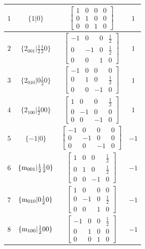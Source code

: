 \documentclass[fleqn,8pt]{jsarticle}
\begin{document}
\begin{longtable}{cccc}
$ 1 $ & $ \{1|0\} $ & $ \begin{bmatrix} 1 & 0 & 0 & 0 \\ 0 & 1 & 0 & 0 \\ 0 & 0 & 1 & 0 \end{bmatrix} $ & $ 1 $ \\ \hline
$ 2 $ & $ \{2{}_{001}|\frac{1}{2} \frac{1}{2} 0\} $ & $ \begin{bmatrix} -1 & 0 & 0 & \frac{1}{2} \\ 0 & -1 & 0 & \frac{1}{2} \\ 0 & 0 & 1 & 0 \end{bmatrix} $ & $ 1 $ \\ \hline
$ 3 $ & $ \{2{}_{010}|0 \frac{1}{2} 0\} $ & $ \begin{bmatrix} -1 & 0 & 0 & 0 \\ 0 & 1 & 0 & \frac{1}{2} \\ 0 & 0 & -1 & 0 \end{bmatrix} $ & $ 1 $ \\ \hline
$ 4 $ & $ \{2{}_{100}|\frac{1}{2} 0 0\} $ & $ \begin{bmatrix} 1 & 0 & 0 & \frac{1}{2} \\ 0 & -1 & 0 & 0 \\ 0 & 0 & -1 & 0 \end{bmatrix} $ & $ 1 $ \\ \hline
$ 5 $ & $ \{-1|0\} $ & $ \begin{bmatrix} -1 & 0 & 0 & 0 \\ 0 & -1 & 0 & 0 \\ 0 & 0 & -1 & 0 \end{bmatrix} $ & $ -1 $ \\ \hline
$ 6 $ & $ \{{\rm m}_{001}|\frac{1}{2} \frac{1}{2} 0\} $ & $ \begin{bmatrix} 1 & 0 & 0 & \frac{1}{2} \\ 0 & 1 & 0 & \frac{1}{2} \\ 0 & 0 & -1 & 0 \end{bmatrix} $ & $ -1 $ \\ \hline
$ 7 $ & $ \{{\rm m}_{010}|0 \frac{1}{2} 0\} $ & $ \begin{bmatrix} 1 & 0 & 0 & 0 \\ 0 & -1 & 0 & \frac{1}{2} \\ 0 & 0 & 1 & 0 \end{bmatrix} $ & $ -1 $ \\ \hline
$ 8 $ & $ \{{\rm m}_{100}|\frac{1}{2} 0 0\} $ & $ \begin{bmatrix} -1 & 0 & 0 & \frac{1}{2} \\ 0 & 1 & 0 & 0 \\ 0 & 0 & 1 & 0 \end{bmatrix} $ & $ -1 $ \\
\end{longtable}
\end{document}
